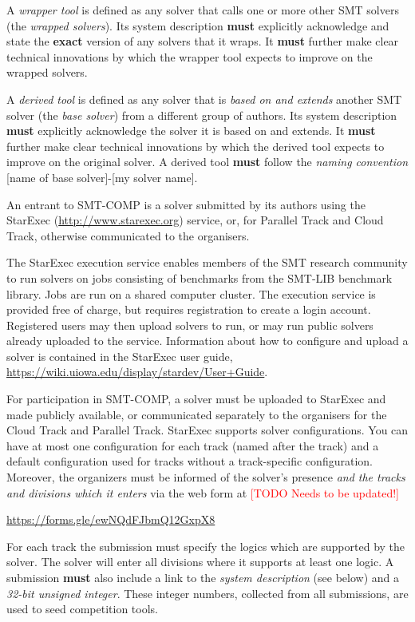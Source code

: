 \documentclass[12pt]{article}
\newcommand{\rem}[1]{\textcolor{red}{[#1]}}
\newcommand{\todo}[1]{\rem{TODO #1}}
\newcommand{\paralleltrack}{Parallel Track\xspace}
\newcommand{\cloudtrack}{Cloud Track\xspace}
\begin{document}
%
A \emph{wrapper tool} is defined as any solver that calls one or more other SMT
solvers (the \emph{wrapped solvers}). Its system description \textbf{must}
explicitly acknowledge and state the \textbf{exact} version of any solvers that
it wraps.  It \textbf{must} further make clear technical innovations by which
the wrapper tool expects to improve on the wrapped solvers.

%
A \emph{derived tool} is defined as any solver that is \emph{based on and
extends} another SMT solver (the \emph{base solver}) from a different
group of authors.  Its system description
\textbf{must} explicitly acknowledge
the solver it is based on and extends.  It \textbf{must} further make clear
technical innovations by which the derived tool expects to improve on the
original solver.  A derived tool \textbf{must} follow the \emph{naming convention}
{[name of base solver]-[my solver name]}.

%
An entrant to SMT-COMP is a solver submitted by its authors using
the StarExec (\url{http://www.starexec.org}) service, or, for
\paralleltrack{} and \cloudtrack{}, otherwise communicated to the
organisers.


%
The StarExec execution
service enables members of the SMT research community to run solvers
on jobs consisting of benchmarks from the SMT-LIB benchmark library.
Jobs are run on a shared computer cluster.  The execution service is
provided free of charge, but requires registration to create a
login account.  Registered users may then upload solvers to
run, or may run public solvers already uploaded to the service.
Information about how to configure and upload a solver is contained in
the StarExec user guide,
\url{https://wiki.uiowa.edu/display/stardev/User+Guide}.

%
For participation in SMT-COMP, a solver must be uploaded to StarExec
and made publicly available, or communicated separately to the
organisers for the \cloudtrack{} and \paralleltrack{}.  StarExec
supports solver configurations.  You can have at most one configuration
for each track (named after the track) and a default configuration used
for tracks without a track-specific configuration.
Moreover, the organizers must be informed of the solver's presence
\emph{and the tracks and divisions which it enters} via the web form
at \todo{Needs to be updated!}
\begin{center}
  \url{https://forms.gle/ewNQdFJbmQ12GxpX8}
\end{center}
For each track the submission must specify the logics which are
supported by the solver.  The solver will enter all divisions where it
supports at least one logic.  A submission \textbf{must} also include a
link to the \emph{system description} (see below) and a \emph{32-bit
  unsigned integer}.  These integer numbers, collected from all
submissions, are used to seed competition tools.
\end{document}
